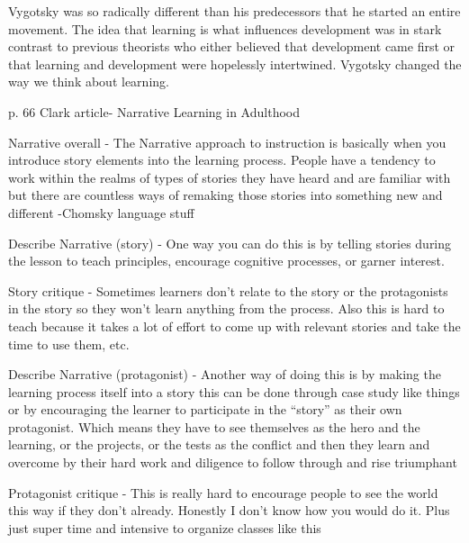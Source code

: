 \documentclass[12pt]{article}
\begin{document}
Vygotsky was so radically different than his predecessors that he started an entire movement. The idea that learning is what influences development was in stark contrast to previous theorists who either believed that development came first or that learning and development were hopelessly intertwined. Vygotsky changed the way we think about learning.

\clearpage
\begin{center}
    {\LARGE }
\end{center}

p. 66 Clark article- Narrative Learning in Adulthood

Narrative overall - The Narrative approach to instruction is basically when you introduce story elements into the learning process. People have a tendency to work within the realms of types of stories they have heard and are familiar with but there are countless ways of remaking those stories into something new and different -Chomsky language stuff

Describe Narrative (story) - One way you can do this is by telling stories during the lesson to teach principles, encourage cognitive processes, or garner interest.

Story critique - Sometimes learners don’t relate to the story or the protagonists in the story so they won’t learn anything from the process. Also this is hard to teach because it takes a lot of effort to come up with relevant stories and take the time to use them, etc. 

Describe Narrative (protagonist) - Another way of doing this is by making the learning process itself into a story this can be done through case study like things or by encouraging the learner to participate in the “story” as their own protagonist. Which means they have to see themselves as the hero and the learning, or the projects, or the tests as the conflict and then they learn and overcome by their hard work and diligence to follow through and rise triumphant

Protagonist critique - This is really hard to encourage people to see the world this way if they don’t already. Honestly I don’t know how you would do it. Plus just super time and intensive to organize classes like this
\end{document}
